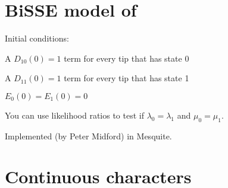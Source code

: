 \documentclass[landscape]{foils}
\begin{document}
\myNewSlide
\section*{BiSSE model of \citet{MaddisonMO2007}}
Initial conditions:
\begin{compactitem}
	\item[] A $D_{10}(0) = 1$ term for every tip that has state 0
	\item[] A $D_{11}(0) = 1$ term for every tip that has state 1
	\item[] $E_0(0) = E_1(0) = 0$
\end{compactitem}

You can use likelihood ratios to test if $\lambda_0 = \lambda_1$ and $\mu_0=\mu_1$.

Implemented (by Peter Midford) in Mesquite.

\myNewSlide
\section*{Continuous characters}

\myNewSlide


\myNewSlide


\myNewSlide


\myNewSlide




\myNewSlide

\end{document}
